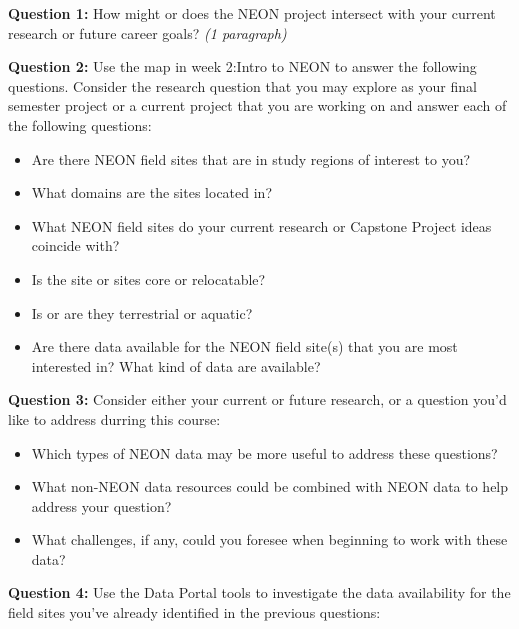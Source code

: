 \documentclass[]{book}
\providecommand{\tightlist}{%
  \setlength{\itemsep}{0pt}\setlength{\parskip}{0pt}}
\begin{document}
\textbf{Question 1:} How might or does the NEON project
intersect with your current research or future career goals? \emph{(1 paragraph)}

\leavevmode\hypertarget{ds-challenge}{}%
\textbf{Question 2:}
Use the map in week 2:Intro to NEON to answer the following questions. Consider the research question that you may explore as your final semester project or a current project that you are working on and answer each of the following questions:

\begin{itemize}
\tightlist
\item
  Are there NEON field sites that are in study regions of interest to you?\\
\item
  What domains are the sites located in?\\
\item
  What NEON field sites do your current research or Capstone Project ideas
  coincide with?\\
\item
  Is the site or sites core or relocatable?\\
\item
  Is or are they terrestrial or aquatic?\\
\item
  Are there data available for the NEON field site(s) that you are most
  interested in? What kind of data are available?
\end{itemize}

\leavevmode\hypertarget{ds-challenge}{}%
\textbf{Question 3:}
Consider either your current or future research, or a question you'd like to
address durring this course:

\begin{itemize}
\tightlist
\item
  Which types of NEON data may be more useful to address these questions?
\item
  What non-NEON data resources could be combined with NEON data to help address your question?
\item
  What challenges, if any, could you foresee when beginning to work with these
  data?
\end{itemize}

\leavevmode\hypertarget{ds-challenge}{}%
\textbf{Question 4:}
Use the Data Portal tools to investigate the data availability for the field
sites you've already identified in the previous questions:
\end{document}
